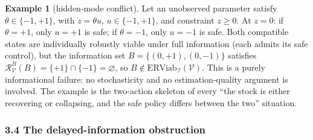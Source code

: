 \documentclass[11pt]{article}
\theoremstyle{definition}
\newtheorem{example}{Example}
\begin{document}
\begin{example}[hidden-mode conflict]\label{ex:hidden-mode} Let an unobserved parameter satisfy
\(\theta \in \{-1, +1\}\), with \(\dot z = \theta u\),
\(u \in \{-1, +1\}\), and constraint \(z \ge 0\). At \(z = 0\): if
\(\theta = +1\), only \(u = +1\) is safe; if \(\theta = -1\), only
\(u = -1\) is safe. Both compatible states are individually robustly
viable under full information (each admits its safe control), but the
information set \(B = \{(0, +1), (0, -1)\}\) satisfies
\(\mathcal{R}_{\mathcal{V}}^B(B) = \{+1\} \cap \{-1\} = \varnothing\),
so \(B \notin \mathrm{ERViab}_{\mathcal{I}}(\mathcal{V})\). This is a
purely informational failure: no stochasticity and no estimation-quality
argument is involved. The example is the two-action skeleton of every
``the stock is either recovering or collapsing, and the safe policy
differs between the two'' situation.

\end{example}

\subsubsection{3.4 The delayed-information
obstruction}\label{the-delayed-information-obstruction}
\end{document}
